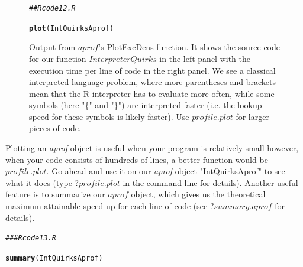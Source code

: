 \documentclass{article}\usepackage[]{graphicx}\usepackage[]{color}
\makeatletter
\newcommand{\hlcom}[1]{\textcolor[rgb]{0.678,0.584,0.686}{\textit{#1}}}%
\newcommand{\hlstd}[1]{\textcolor[rgb]{0.345,0.345,0.345}{#1}}%
\newcommand{\hlkwd}[1]{\textcolor[rgb]{0.737,0.353,0.396}{\textbf{#1}}}%
\newenvironment{kframe}{%
 \def\at@end@of@kframe{}%
 \ifinner\ifhmode%
  \def\at@end@of@kframe{\end{minipage}}%
  \begin{minipage}{\columnwidth}%
 \fi\fi%
 \def\FrameCommand##1{\hskip\@totalleftmargin \hskip-\fboxsep
 \colorbox{shadecolor}{##1}\hskip-\fboxsep
     \hskip-\linewidth \hskip-\@totalleftmargin \hskip\columnwidth}%
 \MakeFramed {\advance\hsize-\width
   \@totalleftmargin\z@ \linewidth\hsize
   \@setminipage}}%
 {\par\unskip\endMakeFramed%
 \at@end@of@kframe}
\newenvironment{knitrout}{}{} %
\makeatother
\begin{document}
\begin{figure}
\begin{center}
\begin{knitrout}
\color{fgcolor}\begin{kframe}
\begin{alltt}
\hlcom{## Rcode12.R}

\hlkwd{plot}\hlstd{(IntQuirksAprof)}
\end{alltt}


{\ttfamily\noindent\bfseries\color{errorcolor}{\#\# Error: object 'IntQuirksAprof' not found}}\end{kframe}
\end{knitrout}
\caption{Output from $aprof$'s PlotExcDens function. It shows the source code for our 
function $InterpreterQuirks$ in the left panel with the execution time per line of code in the right panel. We see a classical interpreted language problem, where more parentheses and brackets mean that the R interpreter has to evaluate more often, while some symbols (here "\{" and "\}") are interpreted faster (i.e. the lookup speed for these symbols is likely faster). Use $profile.plot$ for larger pieces of code. }\label{fig:intquirks}
\end{center}
\end{figure}
\clearpage

Plotting an \textit{aprof} object is useful when your program is relatively small however, when your code consists of hundreds of lines, a better function would be $profile.plot$. Go ahead and use it on our \textit{aprof} object "IntQuirksAprof" to see what it does (type $?profile.plot$ in the command line for details). Another useful feature is to summarize our $aprof$ object, which gives us the theoretical maximum attainable speed-up for each line of code (see $?summary.aprof$ for details). 

\begin{knitrout}\small
{}\color{fgcolor}\begin{kframe}
\begin{alltt}
\hlcom{###Rcode13.R}

\hlkwd{summary}\hlstd{(IntQuirksAprof)}
\end{alltt}


{\ttfamily\noindent\bfseries\color{errorcolor}{\#\# Error: object 'IntQuirksAprof' not found}}\end{kframe}
\end{knitrout}
\end{document}

